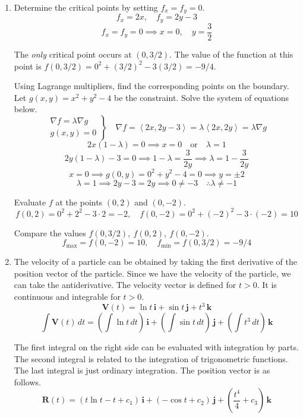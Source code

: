 \documentclass[a4paper, 12pt]{article}
\begin{document}
\begin{enumerate}[leftmargin=*,label=\textbf{\arabic*.}]

\item Determine the critical points by setting $f_x=f_y=0$.
\[f_x=2x,\quad f_y=2y-3\]
\[f_x=f_y=0\implies x=0,\quad y=\frac32\]

The \textit{only} critical point occurs at $(0,3/2)$. The value of the function at this point is $f(0, 3/2) = 0^2 + (3/2)^2 -3(3/2)=-9/4$.

Using Lagrange multipliers, find the corresponding points on the boundary. Let $g(x,y)=x^2+y^2-4$ be the constraint. Solve the system of equations below.
\[
\left.
\begin{array}{ll}
\displaystyle\nabla f =\lambda \nabla g\\
\displaystyle g(x,y) = 0
\end{array}
\right\}\quad
\nabla f = \left\langle2x,2y-3\right\rangle=\lambda\left\langle2x,2y\right\rangle= \lambda\nabla g
\]
\[2x(1-\lambda)=0\implies x=0\quad\text{or}\quad\lambda=1\]
\[2y(1-\lambda)-3=0\implies1-\lambda=\frac3{2y}\implies\lambda=1-\frac3{2y}\]
\[x=0\implies g(0,y)=0^2+y^2-4=0\implies y=\pm2\]
\[\lambda=1\implies 2y-3=2y\implies 0\neq-3\quad\therefore\lambda\neq-1\]

Evaluate $f$ at the points $(0,2)$ and $(0,-2)$.
\[f(0,2)=0^2+2^2-3\cdot2=-2,\quad f(0,-2)=0^2+(-2)^2-3\cdot(-2)=10\]

Compare the values $f(0,3/2),\:f(0,2),\:f(0,-2)$.
\[\boxed{f_{\text{max}}=f(0,-2)=10,\quad f_{\text{min}}=f(0,3/2)=-9/4}\]

\item The velocity of a particle can be obtained by taking the first derivative of the position vector of the particle. Since we have the velocity of the particle, we can take the antiderivative. The velocity vector is defined for $t>0$. It is continuous and integrable for $t>0$.
\[\mathbf{V}(t)=\ln t\,\mathbf{i}+\sin t\,\mathbf{j}+t^3\,\mathbf{k}\]
\[\int\mathbf{V}(t)\,dt=\left(\int\ln t\,dt\right)\,\mathbf{i}+\left(\int\sin t\,dt\right)\,\mathbf{j}+\left(\int t^3\,dt\right)\,\mathbf{k}\]

The first integral on the right side can be evaluated with integration by parts. The second integral is related to the integration of trigonometric functions. The last integral is just ordinary integration. The position vector is as follows.
\[\mathbf{R}(t)=(t\ln t- t+c_1)\,\mathbf{i}+(-\cos t+c_2)\,\mathbf{j}+\left(\frac{t^4}4+c_3\right)\,\mathbf{k}\]


\end{enumerate}
\end{document}
